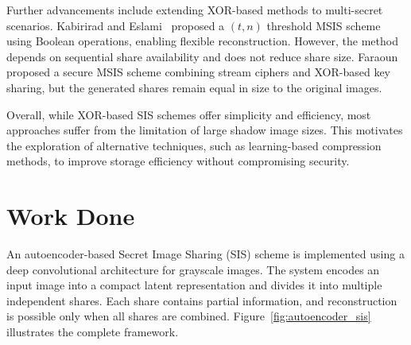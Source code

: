 Further advancements include extending XOR-based methods to multi-secret scenarios. Kabirirad and Eslami~\cite{kabirirad2018t} proposed a $(t,n)$ threshold MSIS scheme using Boolean operations, enabling flexible reconstruction. However, the method depends on sequential share availability and does not reduce share size. Faraoun~\cite{faraoun2020} proposed a secure MSIS scheme combining stream ciphers and XOR-based key sharing, but the generated shares remain equal in size to the original images.

Overall, while XOR-based SIS schemes offer simplicity and efficiency, most approaches suffer from the limitation of large shadow image sizes. This motivates the exploration of alternative techniques, such as learning-based compression methods, to improve storage efficiency without compromising security.


\section{Work Done}
\label{sec:lad-work}

An autoencoder-based Secret Image Sharing (SIS) scheme is implemented using a deep convolutional architecture for grayscale images. The system encodes an input image into a compact latent representation and divides it into multiple independent shares. Each share contains partial information, and reconstruction is possible only when all shares are combined. Figure~\ref{fig:autoencoder_sis} illustrates the complete framework.

